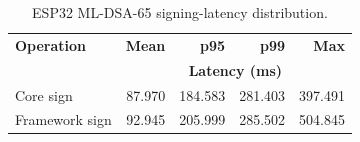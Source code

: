 \begin{table}[t]
\centering
\caption{ESP32 ML-DSA-65 signing-latency distribution.}
\label{tab:esp32-sign-tail}
\begin{tabular}{lrrrr}
\hline
\textbf{Operation} &
\textbf{Mean} &
\textbf{p95} &
\textbf{p99} &
\textbf{Max} \\
&
\multicolumn{4}{c}{\textbf{Latency (ms)}} \\
\hline
Core sign &
87.970 &
184.583 &
281.403 &
397.491 \\

Framework sign &
92.945 &
205.999 &
285.502 &
504.845 \\
\hline
\end{tabular}
\end{table}
